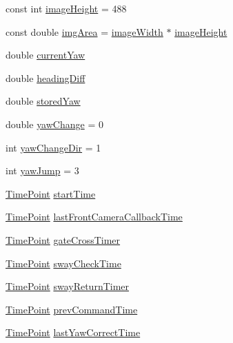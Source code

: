 \begin{DoxyCompactItemize}
\item 
const int \hyperlink{classPathPlanner_a83b54a87f884285d41642702c46368a8}{image\+Height} = 488
\item 
const double \hyperlink{classPathPlanner_aa95f3eb27d53bdf487145755a0cb85c9}{img\+Area} = \hyperlink{classPathPlanner_ab562d2e58308fd42088587858d7193ab}{image\+Width} $\ast$ \hyperlink{classPathPlanner_a83b54a87f884285d41642702c46368a8}{image\+Height}
\item 
double \hyperlink{classPathPlanner_a069162f445adcdef1e916ce8d43fd34a}{current\+Yaw}
\item 
double \hyperlink{classPathPlanner_a074f33607f0c0bb7a303e80d52ce79b4}{heading\+Diff}
\item 
double \hyperlink{classPathPlanner_ab3c86e85339eedec45c050955ca9a6b9}{stored\+Yaw}
\item 
double \hyperlink{classPathPlanner_a60f7621c34683c9e3b64d89a36358c48}{yaw\+Change} = 0
\item 
int \hyperlink{classPathPlanner_a43393934c97970d243fbb219ee8c909d}{yaw\+Change\+Dir} = 1
\item 
int \hyperlink{classPathPlanner_a2312e73d3f37acf470f448afaa262afe}{yaw\+Jump} = 3
\item 
\hyperlink{thruster__driver_8cpp_ad3e807c387dc076de974ff7eac67ad81}{Time\+Point} \hyperlink{classPathPlanner_a201a2c207e4abfee915a7acd5c9cae0e}{start\+Time}
\item 
\hyperlink{thruster__driver_8cpp_ad3e807c387dc076de974ff7eac67ad81}{Time\+Point} \hyperlink{classPathPlanner_aec7cfd25a48b711818991f5f449a050b}{last\+Front\+Camera\+Callback\+Time}
\item 
\hyperlink{thruster__driver_8cpp_ad3e807c387dc076de974ff7eac67ad81}{Time\+Point} \hyperlink{classPathPlanner_a4d3c427f732be34f6662f311436a3f5e}{gate\+Cross\+Timer}
\item 
\hyperlink{thruster__driver_8cpp_ad3e807c387dc076de974ff7eac67ad81}{Time\+Point} \hyperlink{classPathPlanner_a579c296b95e4dcb2f7e7b56b90082184}{sway\+Check\+Time}
\item 
\hyperlink{thruster__driver_8cpp_ad3e807c387dc076de974ff7eac67ad81}{Time\+Point} \hyperlink{classPathPlanner_a449a30ac5feb833004e42156124aeb35}{sway\+Return\+Timer}
\item 
\hyperlink{thruster__driver_8cpp_ad3e807c387dc076de974ff7eac67ad81}{Time\+Point} \hyperlink{classPathPlanner_a4802cdb753da4fa47854e33f3220db84}{prev\+Command\+Time}
\item 
\hyperlink{thruster__driver_8cpp_ad3e807c387dc076de974ff7eac67ad81}{Time\+Point} \hyperlink{classPathPlanner_a5b503e6eba34d4925b07749f3162f659}{last\+Yaw\+Correct\+Time}

\end{DoxyCompactItemize}
